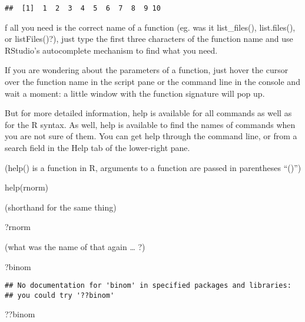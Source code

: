 \documentclass[
]{book}
\newenvironment{Shaded}{\begin{snugshade}}{\end{snugshade}}
\newcommand{\FunctionTok}[1]{\textcolor[rgb]{0.00,0.00,0.00}{#1}}
\newcommand{\NormalTok}[1]{#1}
\begin{document}
\begin{verbatim}
##  [1]  1  2  3  4  5  6  7  8  9 10
\end{verbatim}

f all you need is the correct name of a function (eg. was it list\_files(), list.files(), or listFiles()?), just type the first three characters of the function name and use RStudio's autocomplete mechanism to find what you need.

If you are wondering about the parameters of a function, just hover the cursor over the function name in the script pane or the command line in the console and wait a moment: a little window with the function signature will pop up.

But for more detailed information, help is available for all commands as well as for the R syntax. As well, help is available to find the names of commands when you are not sure of them. You can get help through the command line, or from a search field in the Help tab of the lower-right pane.

(help() is a function in R, arguments to a function are passed in parentheses ``()'')

\begin{Shaded}
\begin{Highlighting}[]
\FunctionTok{help}\NormalTok{(rnorm)}
\end{Highlighting}
\end{Shaded}

(shorthand for the same thing)

\begin{Shaded}
\begin{Highlighting}[]
\NormalTok{?rnorm}
\end{Highlighting}
\end{Shaded}

(what was the name of that again \ldots{} ?)

\begin{Shaded}
\begin{Highlighting}[]
\NormalTok{?binom}
\end{Highlighting}
\end{Shaded}

\begin{verbatim}
## No documentation for 'binom' in specified packages and libraries:
## you could try '??binom'
\end{verbatim}

\begin{Shaded}
\begin{Highlighting}[]
\NormalTok{??binom}
\end{Highlighting}
\end{Shaded}
\end{document}

